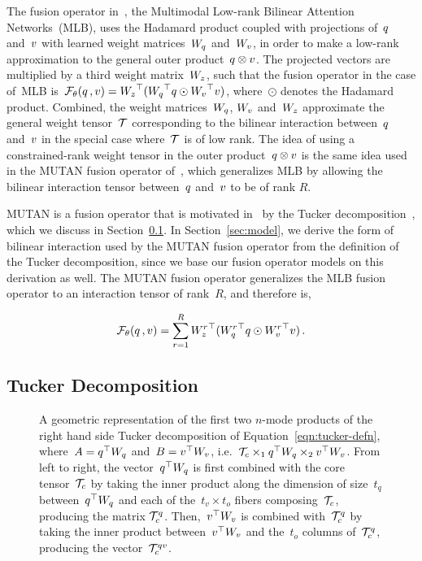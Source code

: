 The fusion operator in~\cite{Kim2017}, the Multimodal Low-rank Bilinear
Attention Networks~(MLB), uses the Hadamard product coupled with projections
of~$q$ and~$v$ with learned weight matrices~$W_{q}$ and~$W_{v}$, in order to
make a low-rank approximation to the general outer product~$q \otimes v$. The
projected vectors are multiplied by a third weight matrix~$W_{z}$, such that
the fusion operator in the case of~MLB
is~$\mathcal{F_{\theta}}{(q \,, v)} = {W_{z}}^\top{} ({W_{q}}^\top{} q \odot {W_{\ensuremath{v}}}^\top{} v)$,
where~$\odot$ denotes the Hadamard product. Combined, the weight
matrices~$W_{q}$, $W_{v}$ and~$W_{z}$ approximate the general weight tensor~$\mathcal{T}$
corresponding to the bilinear interaction between~$q$ and~$v$ in the special
case where~$\mathcal{T}$ is of low rank. The idea of using a constrained-rank weight
tensor in the outer product~$q \otimes v$ is the same idea used in the MUTAN
fusion operator of~\cite{ben2017mutan}, which generalizes MLB by allowing the
bilinear interaction tensor between~$q$ and~$v$ to be of rank $R$.

MUTAN is a fusion operator that is motivated
in~\cite{ben2017mutan} by the Tucker
decomposition~\cite{kolda2009tensor}, which we discuss in
Section~\ref{sec:tucker}. In Section~\ref{sec:model}, we derive the form of
bilinear interaction used by the MUTAN fusion operator from the definition of
the Tucker decomposition, since we base our fusion operator models on this
derivation as well. The MUTAN fusion operator generalizes the MLB fusion
operator to an interaction tensor of rank~$R$, and therefore is,

\begin{equation}
        \mathcal{F_{\theta}}{(q \,, v)} = \sum_{r = 1}^R {W^r_{z}}^\top{} ({W^r_{q}}^\top{} q \odot {W^r_{\ensuremath{v}}}^\top{} v) \,.
\label{eqn:mutan-fusop}
\end{equation}


\subsection{Tucker Decomposition}
\label{sec:tucker}

\newcommand{\qtWq}{\q^\top{} W_\q{}}
\newcommand{\vtWv}{\v^\top{} W_\v{}}
\begin{figure}[!t]
\centering

\caption{A geometric representation of the first two $n$-mode products of the
         right hand side Tucker decomposition of Equation~\ref{eqn:tucker-defn},
         where~$A = \qtWq$ and~$B = \vtWv$, i.e.\ $\T_c \times_1 \qtWq \times_2 \vtWv$.
         From left to right, the vector~$\qtWq$ is first combined with the core
         tensor~$\mathcal{T}_c$ by taking the inner product along the dimension of
         size~$t_q$ between~$\qtWq$ and each of the~$t_v \times t_o$ fibers
         composing~$\mathcal{T}_c$, producing the matrix $\mathcal{T}_c^{q}$.  Then,~$\vtWv$ is
         combined with~$\mathcal{T}_c^{q}$ by taking the inner product between~$\vtWv$
         and the~$t_o$ columns of~$\mathcal{T}_c^{q}$, producing the
         vector~$\mathcal{T}_c^{q{}v{}}$.}
\label{fig:n-mode-prod}
\end{figure}

